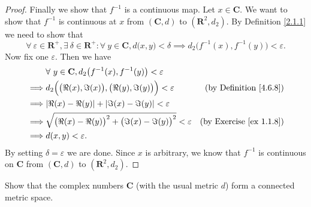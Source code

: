 \begin{proof}
    Finally we show that \(f^{-1}\) is a continuous map.
    Let \(x \in \mathbf{C}\).
    We want to show that \(f^{-1}\) is continuous at \(x\) from \((\mathbf{C}, d)\) to \((\mathbf{R}^2, d_2)\).
    By Definition \ref{2.1.1} we need to show that
    \[
        \forall\ \varepsilon \in \mathbf{R}^+, \exists\ \delta \in \mathbf{R}^+ : \forall\ y \in \mathbf{C}, d\big(x, y\big) < \delta \implies d_2\big(f^{-1}(x), f^{-1}(y)\big) < \varepsilon.
    \]
    Now fix one \(\varepsilon\).
    Then we have
    \begin{align*}
                 & \forall\ y \in \mathbf{C}, d_2\big(f^{-1}(x), f^{-1}(y)\big) < \varepsilon                                           \\
        \implies & d_2\Big(\big(\Re(x), \Im(x)\big), \big(\Re(y), \Im(y)\big)\Big) < \varepsilon  & \text{(by Definition \ref{4.6.8})}  \\
        \implies & \abs*{\Re(x) - \Re(y)} + \abs*{\Im(x) - \Im(y)} < \varepsilon                                                        \\
        \implies & \sqrt{\big(\Re(x) - \Re(y)\big)^2 + \big(\Im(x) - \Im(y)\big)^2} < \varepsilon & \text{(by Exercise \ref{ex 1.1.8})} \\
        \implies & d(x, y) < \varepsilon.
    \end{align*}
    By setting \(\delta = \varepsilon\) we are done.
    Since \(x\) is arbitrary, we know that \(f^{-1}\) is continuous on \(\mathbf{C}\) from \((\mathbf{C}, d)\) to \((\mathbf{R}^2, d_2)\).
\end{proof}

\begin{exercise}\label{ex 4.6.12}
    Show that the complex numbers \(\mathbf{C}\) (with the usual metric \(d\)) form a connected metric space.
\end{exercise}

